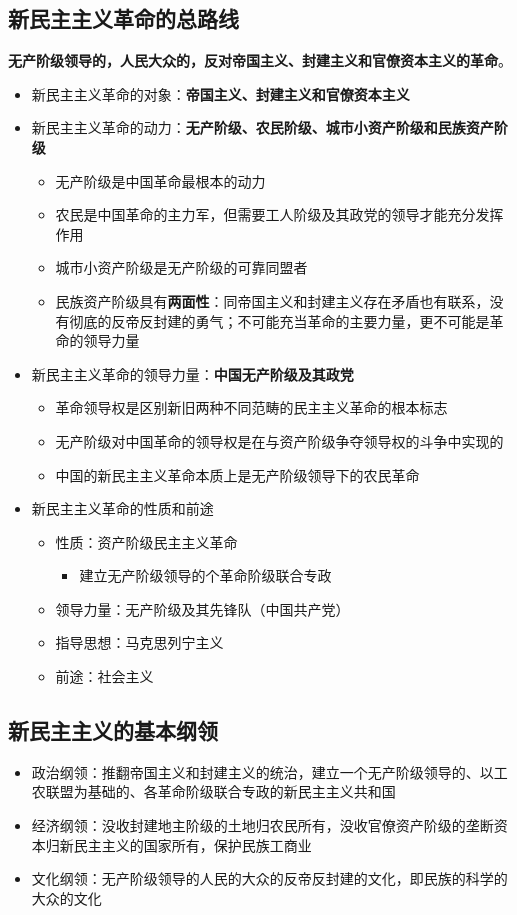 \documentclass[12pt,openany]{ctexbook}
\begin{document}
\subsection{新民主主义革命的总路线}
\textbf{无产阶级领导的，人民大众的，反对帝国主义、封建主义和官僚资本主义的革命}。
\begin{itemize}
  \item 新民主主义革命的对象：\textbf{帝国主义、封建主义和官僚资本主义}
  \item 新民主主义革命的动力：\textbf{无产阶级、农民阶级、城市小资产阶级和民族资产阶级}
\begin{itemize}
  \item 无产阶级是中国革命最根本的动力
  \item 农民是中国革命的主力军，但需要工人阶级及其政党的领导才能充分发挥作用
  \item 城市小资产阶级是无产阶级的可靠同盟者
  \item 民族资产阶级具有\textbf{两面性}：同帝国主义和封建主义存在矛盾也有联系，没有彻底的反帝反封建的勇气；不可能充当革命的主要力量，更不可能是革命的领导力量
\end{itemize}
  \item 新民主主义革命的领导力量：\textbf{中国无产阶级及其政党}
\begin{itemize}
  \item 革命领导权是区别新旧两种不同范畴的民主主义革命的根本标志
  \item 无产阶级对中国革命的领导权是在与资产阶级争夺领导权的斗争中实现的
  \item 中国的新民主主义革命本质上是无产阶级领导下的农民革命
\end{itemize}
  \item 新民主主义革命的性质和前途
\begin{itemize}
  \item 性质：资产阶级民主主义革命
\begin{itemize}
  \item 建立无产阶级领导的个革命阶级联合专政
\end{itemize}
  \item 领导力量：无产阶级及其先锋队（中国共产党）
  \item 指导思想：马克思列宁主义
  \item 前途：社会主义
\end{itemize}
\end{itemize}
\subsection{新民主主义的基本纲领}
\begin{itemize}
  \item 政治纲领：推翻帝国主义和封建主义的统治，建立一个无产阶级领导的、以工农联盟为基础的、各革命阶级联合专政的新民主主义共和国
  \item 经济纲领：没收封建地主阶级的土地归农民所有，没收官僚资产阶级的垄断资本归新民主主义的国家所有，保护民族工商业
  \item 文化纲领：无产阶级领导的人民的大众的反帝反封建的文化，即民族的科学的大众的文化
\end{itemize}
\end{document}
